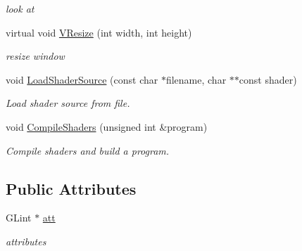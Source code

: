 \begin{DoxyCompactItemize}
\begin{DoxyCompactList}\small\item\em look at \item\end{DoxyCompactList}\item 
\hypertarget{classPlatform_1_1Renderer_1_1GL_1_1Renderer_a9a498d16e76756e8d9c0b534693deb58}{
virtual void \hyperlink{classPlatform_1_1Renderer_1_1GL_1_1Renderer_a9a498d16e76756e8d9c0b534693deb58}{VResize} (int width, int height)}
\label{classPlatform_1_1Renderer_1_1GL_1_1Renderer_a9a498d16e76756e8d9c0b534693deb58}

\begin{DoxyCompactList}\small\item\em resize window \item\end{DoxyCompactList}\item 
void \hyperlink{classPlatform_1_1Renderer_1_1GL_1_1Renderer_ae1f1af7a87dc3f0e3e710dea0150c662}{LoadShaderSource} (const char $\ast$filename, char $\ast$$\ast$const shader)
\begin{DoxyCompactList}\small\item\em Load shader source from file. \item\end{DoxyCompactList}\item 
\hypertarget{classPlatform_1_1Renderer_1_1GL_1_1Renderer_a2675dfc76254db1a1b1603b0eb84b58d}{
void \hyperlink{classPlatform_1_1Renderer_1_1GL_1_1Renderer_a2675dfc76254db1a1b1603b0eb84b58d}{CompileShaders} (unsigned int \&program)}
\label{classPlatform_1_1Renderer_1_1GL_1_1Renderer_a2675dfc76254db1a1b1603b0eb84b58d}

\begin{DoxyCompactList}\small\item\em Compile shaders and build a program. \item\end{DoxyCompactList}\end{DoxyCompactItemize}
\subsection*{Public Attributes}
\begin{DoxyCompactItemize}
\item 
\hypertarget{classPlatform_1_1Renderer_1_1GL_1_1Renderer_a383d4ec5c19cf060fd53ed5c02931172}{
GLint $\ast$ \hyperlink{classPlatform_1_1Renderer_1_1GL_1_1Renderer_a383d4ec5c19cf060fd53ed5c02931172}{att}}
\label{classPlatform_1_1Renderer_1_1GL_1_1Renderer_a383d4ec5c19cf060fd53ed5c02931172}

\begin{DoxyCompactList}\small\item\em attributes \item\end{DoxyCompactList}\end{DoxyCompactItemize}



